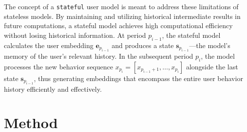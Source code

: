 \documentclass{article}
\begin{document}
The concept of a \texttt{stateful} user model is meant to address these limitations of stateless models. By maintaining and utilizing historical intermediate results in future computations, a stateful model achieves high computational efficiency without losing historical information. At period $p_{i-1}$, the stateful model calculates the user embedding ${\bm{e}_{p_{i-1}}}$ and produces a state ${\bm{s}_{p_{i-1}}}$—the model's memory of the user's relevant history. In the subsequent period $p_i$, the model processes the new behavior sequence $x_{p_{i}}=[x_{p_{i-1}+1},\ldots,x_{p_i}]$ alongside the last state ${\bm{s}_{p_{i-1}}}$, thus generating embeddings that encompass the entire user behavior history efficiently and effectively.




\section{Method}
\end{document}
